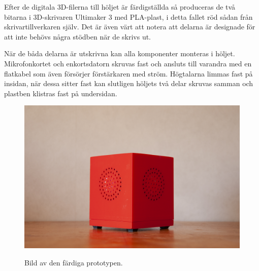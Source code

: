 Efter de digitala 3D-filerna till höljet är färdigställda så produceras de två bitarna i 3D-skrivaren Ultimaker 3 med PLA-plast, i detta fallet röd sådan från skrivar\-tillverkaren själv. Det är även värt att notera att delarna är designade för att inte behövs några stödben när de skrivs ut.

När de båda delarna är utskrivna kan alla komponenter monteras i höljet. Mikrofonkortet och enkortsdatorn skruvas fast och ansluts till varandra med en flatkabel som även försörjer förstärkaren med ström. Högtalarna limmas fast på insidan, när dessa sitter fast kan slutligen höljets två delar skruvas samman och plastben klistras fast på undersidan.


\begin{figure}[H]
    \centering
    \caption{\small Bild av den färdiga prototypen.}
    \includegraphics[width=14cm]{bilder/finale_unit_small.jpg}
    \label{fig:finale_unit} 
\end{figure}

